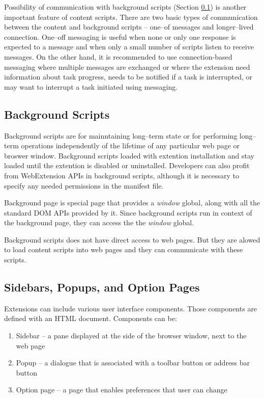 Possibility of communication with background scripts (Section \ref{text:backgroundScripts}) is another important feature of content scripts. There are two basic types of communication between the content and background scripts -- one--of messages and longer--lived connection. One--off messaging is useful when none or only one response is expected to a message and when only a small number of scripts listen to receive messages. On the other hand, it is recommended to use connection-based messaging where multiple messages are exchanged or where the extension need information about task progress, needs to be notified if a task is interrupted, or may want to interrupt a task initiated using messaging. \cite{extensionContentScripts}

\subsection{Background Scripts}
\label{text:backgroundScripts}
Background scripts are for mainntaining long--term state or for performing long--term operations independently of the lifetime of any particular web page or broswer window. Background scripts loaded with extention installation and stay loaded until the extention is disabled or uninstalled. Developers can also profit from WebExtension APIs in background scripts, although it is necessary to specify any needed permissions in the manifest file. \cite{extensionAnatomy}

Background page is special page that provides a \textit{window} global, along with all the standard DOM APIs provided by it. Since background scripts run in context of the background page, they can access the the \textit{window} global. \cite{extensionAnatomy}

Background scripts does not have direct access to web pages. But they are alowed to load content scripts into web pages and they can communicate with these scripts. \cite{extensionAnatomy}
\subsection{Sidebars, Popups, and Option Pages}
Extensions can include various user interface components. Those components are defined with an HTML document. Components can be:
\begin{enumerate}
    \item Sidebar -- a pane displayed at the side of the browser window, next to the web page
    \item Popup -- a dialogue that is associated with a toolbar button or address bar button
    \item Option page -- a page that enables preferences that user can change
\end{enumerate}


